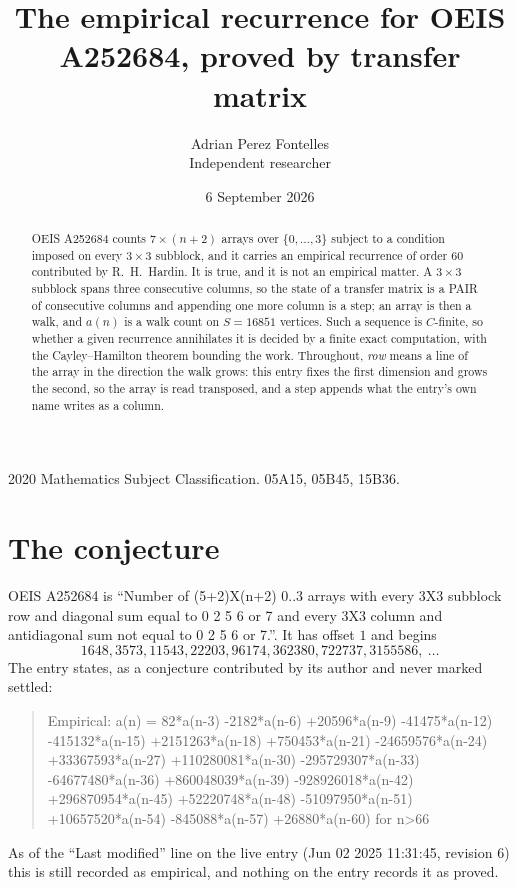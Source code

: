 \documentclass[11pt,a4paper]{article}
\title{The empirical recurrence for OEIS A252684, proved by transfer matrix}
\author{Adrian Perez Fontelles\\ \small Independent researcher}
\date{6 September 2026}
\theoremstyle{plain}
\theoremstyle{definition}
\begin{document}
\maketitle

\begin{abstract}
OEIS A252684 counts $7\times(n+2)$ arrays over $\{0,\dots,3\}$ subject to a condition imposed on
every $3\times3$ subblock, and it carries an empirical recurrence of order $60$
contributed by R.~H.~Hardin. It is true, and it is not an empirical matter. A $3\times3$
subblock spans three consecutive columns, so the state of a transfer matrix is a PAIR of
consecutive columns and appending one more column is a step; an array is then a walk, and
$a(n)$ is a walk count on $S=16851$ vertices. Such a sequence is $C$-finite, so whether a given
recurrence annihilates it is decided by a finite exact computation, with the Cayley--Hamilton
theorem bounding the work.
 Throughout, \emph{row} means a line of the array in the direction the walk grows: this entry fixes the first dimension and grows the second, so the array is read transposed, and a step appends what the entry's own name writes as a column.\end{abstract}

\noindent\small 2020 Mathematics Subject Classification. 05A15, 05B45, 15B36.\normalsize

\section{The conjecture}

OEIS A252684 is ``Number of (5+2)X(n+2) 0..3 arrays with every 3X3 subblock row and diagonal sum equal to 0 2 5 6 or 7 and every 3X3 column and antidiagonal sum not equal to 0 2 5 6 or 7.''. It has offset $1$ and begins
\[
1648, 3573, 11543, 22203, 96174, 362380, 722737, 3155586,\ \dots
\]
The entry states, as a conjecture contributed by its author and never marked settled:
\begin{quote}
Empirical: a(n) = 82*a(n-3) -2182*a(n-6) +20596*a(n-9) -41475*a(n-12) -415132*a(n-15) +2151263*a(n-18) +750453*a(n-21) -24659576*a(n-24) +33367593*a(n-27) +110280081*a(n-30) -295729307*a(n-33) -64677480*a(n-36) +860048039*a(n-39) -928926018*a(n-42) +296870954*a(n-45) +52220748*a(n-48) -51097950*a(n-51) +10657520*a(n-54) -845088*a(n-57) +26880*a(n-60) for n>66
\end{quote}
As of the ``Last modified'' line on the live entry (Jun 02 2025 11:31:45, revision 6) this is still
recorded as empirical, and nothing on the entry records it as proved.
\end{document}
